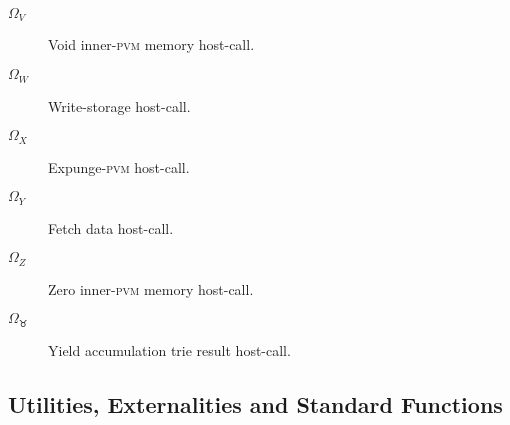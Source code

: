 \begin{description}
\begin{description}
    \item[$\Omega_V$] Void inner-\textsc{pvm} memory host-call.
    \item[$\Omega_W$] Write-storage host-call.
    \item[$\Omega_X$] Expunge-\textsc{pvm} host-call.
    \item[$\Omega_Y$] Fetch data host-call.
    \item[$\Omega_Z$] Zero inner-\textsc{pvm} memory host-call.
    \item[$\Omega_\Taurus$] Yield accumulation trie result host-call.
  \end{description}
\end{description}

\subsection{Utilities, Externalities and Standard Functions}

